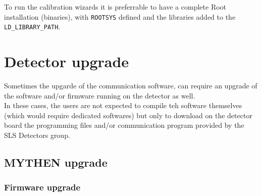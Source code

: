 \documentclass{article}
\begin{document}
To run the calibration wizards it is preferrable to have a complete Root installation (binaries), with \verb=ROOTSYS= defined and the libraries added to the \verb=LD_LIBRARY_PATH=.


\section{Detector upgrade}

Sometimes the upgarde of the communication software, can require an upgrade of the software and/or firmware running on the detector as well.\\
In these cases, the users are not expected to compile teh software themselves (which would require dedicated softwares) but only to download on the detector board the programming files and/or communication program provided by the SLS Detectors group.


\subsection{MYTHEN upgrade}
\subsubsection{Firmware upgrade}
\end{document}
